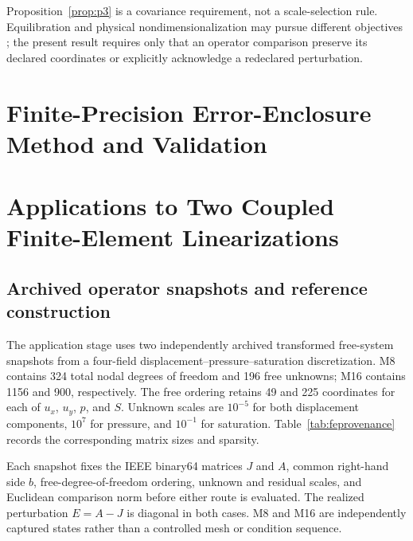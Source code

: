 \documentclass[preprint,12pt]{elsarticle}
\theoremstyle{definition}
\begin{document}
Proposition~\ref{prop:p3} is a covariance requirement, not a scale-selection rule. Equilibration and physical nondimensionalization may pursue different objectives \cite{S07,S08}; the present result requires only that an operator comparison preserve its declared coordinates or explicitly acknowledge a redeclared perturbation.

\FloatBarrier
\section{Finite-Precision Error-Enclosure Method and Validation}
\label{sec:error_enclosure}



\FloatBarrier

\section{Applications to Two Coupled Finite-Element Linearizations}
\label{sec:applications}

\subsection{Archived operator snapshots and reference construction}

The application stage uses two independently archived transformed free-system snapshots from a four-field displacement--pressure--saturation discretization. M8 contains 324 total nodal degrees of freedom and 196 free unknowns; M16 contains 1156 and 900, respectively. The free ordering retains 49 and 225 coordinates for each of $u_x$, $u_y$, $p$, and $S$. Unknown scales are $10^{-5}$ for both displacement components, $10^7$ for pressure, and $10^{-1}$ for saturation. Table~\ref{tab:feprovenance} records the corresponding matrix sizes and sparsity.

\begin{table}[htbp]
\centering
\footnotesize
\caption{Provenance and coordinate content of the archived finite-element tangents. Each per-field count applies to $u_x$, $u_y$, $p$, and $S$.}
\label{tab:feprovenance}

\end{table}

Each snapshot fixes the IEEE binary64 matrices $J$ and $A$, common right-hand side $b$, free-degree-of-freedom ordering, unknown and residual scales, and Euclidean comparison norm before either route is evaluated. The realized perturbation $E=A-J$ is diagonal in both cases. M8 and M16 are independently captured states rather than a controlled mesh or condition sequence.
\end{document}
